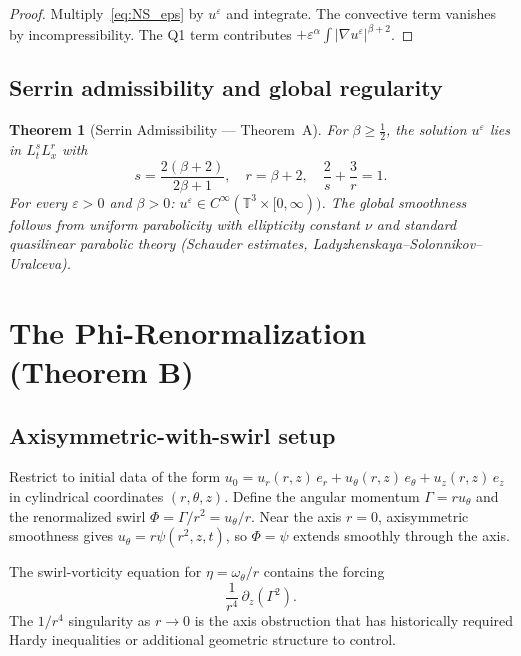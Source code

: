 \documentclass[11pt]{article}
\newtheorem{theorem}{Theorem}[section]
\newcommand{\eps}{\varepsilon}
\newcommand{\T}{\mathbb{T}}
\begin{document}
\begin{proof}
Multiply~\eqref{eq:NS_eps} by $u^\eps$ and integrate.
The convective term vanishes by incompressibility.
The Q1 term contributes $+\eps^\alpha\int|\nabla u^\eps|^{\beta+2}$.
\end{proof}

\subsection{Serrin admissibility and global regularity}

\begin{theorem}[Serrin Admissibility --- Theorem~A]\label{thm:A}
For $\beta\ge\tfrac12$, the solution $u^\eps$ lies in
$L^s_t L^r_x$ with
\[
  s = \frac{2(\beta+2)}{2\beta+1},\quad
  r = \beta+2,\quad
  \frac{2}{s}+\frac{3}{r}=1.
\]
For every $\eps>0$ and $\beta>0$:
$u^\eps\in C^\infty(\T^3\times[0,\infty))$.
The global smoothness follows from uniform parabolicity with
ellipticity constant $\nu$ and standard quasilinear parabolic
theory (Schauder estimates, Ladyzhenskaya--Solonnikov--Uralceva).
\end{theorem}

\section{The Phi-Renormalization (Theorem B)}

\subsection{Axisymmetric-with-swirl setup}

Restrict to initial data of the form
$u_0 = u_r(r,z)\,e_r + u_\theta(r,z)\,e_\theta + u_z(r,z)\,e_z$
in cylindrical coordinates $(r,\theta,z)$.
Define the angular momentum $\Gamma = r u_\theta$ and
the renormalized swirl $\Phi = \Gamma/r^2 = u_\theta/r$.
Near the axis $r=0$, axisymmetric smoothness gives
$u_\theta = r\psi(r^2,z,t)$, so $\Phi = \psi$ extends smoothly
through the axis.

The swirl-vorticity equation for $\eta = \omega_\theta/r$
contains the forcing
\begin{equation}\label{eq:axis_sing}
  \frac{1}{r^4}\,\partial_z(\Gamma^2).
\end{equation}
The $1/r^4$ singularity as $r\to0$ is the axis obstruction
that has historically required Hardy inequalities
or additional geometric structure to control.
\end{document}

